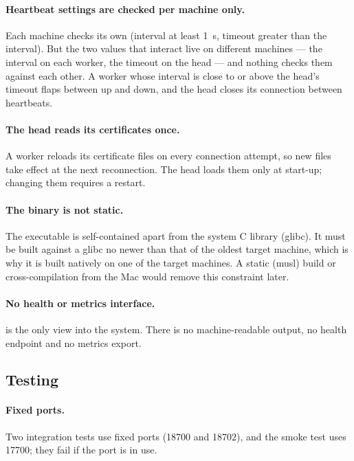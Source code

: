 \documentclass{article}
\begin{document}
\paragraph{Heartbeat settings are checked per machine only.}
Each machine checks its own  (interval at least 1~s,
timeout greater than the interval). But the two values that interact live
on different machines --- the interval on each worker, the timeout on the
head --- and nothing checks them against each other. A worker whose
interval is close to or above the head's timeout flaps between up and
down, and the head closes its connection between heartbeats.

\paragraph{The head reads its certificates once.}
A worker reloads its certificate files on every connection attempt, so
new files take effect at the next reconnection. The head loads them only
at start-up; changing them requires a restart.

\paragraph{The binary is not static.}
The executable is self-contained apart from the system C library (glibc).
It must be built against a glibc no newer than that of the oldest target
machine, which is why it is built natively on one of the target machines.
A static (musl) build or cross-compilation from the Mac would remove this
constraint later.

\paragraph{No health or metrics interface.}
 is the only view into the system. There is no
machine-readable output, no health endpoint and no metrics export.

\subsection{Testing}
\label{sec:lim-testing}

\paragraph{Fixed ports.}
Two integration tests use fixed ports (18700 and 18702), and the smoke
test uses 17700; they fail if the port is in use.
\end{document}
